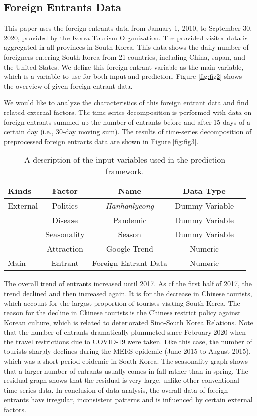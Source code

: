\documentclass[conference]{IEEEtran}
\begin{document}
\subsection{Foreign Entrants Data}\label{IT}

This paper uses the foreign entrants data from January 1, 2010, to September 30, 2020, provided by the Korea Tourism Organization. The provided visitor data is aggregated in all provinces in South Korea. This data shows the daily number of foreigners entering South Korea from 21 countries, including China, Japan, and the United States. We define this foreign entrant variable as the main variable, which is a variable to use for both input and prediction. Figure \ref{fig:fig2} shows the overview of given foreign entrant data.

We would like to analyze the characteristics of this foreign entrant data and find related external factors. The time-series decomposition is performed with data on foreign entrants summed up the number of entrants before and after 15 days of a certain day (i.e., 30-day moving sum). The results of time-series decomposition of preprocessed foreign entrants data are shown in Figure \ref{fig:fig3}. 

\begin{table}[t]
\centering
\caption{A description of the input variables used in the prediction framework.}
\begin{tabular}[t]{lcccc}
\hline
Kinds&Factor&Name&Data Type\\
\hline
External&Politics&\textit{Hanhanlyeong}&Dummy Variable\\
&Disease&Pandemic&Dummy Variable\\
&Seasonality&Season&Dummy Variable\\
&Attraction&Google Trend&Numeric\\
\hline
Main&Entrant&Foreign Entrant Data&Numeric\\
\hline
\end{tabular}
\label{table:tb1}
\end{table}

The overall trend of entrants increased until 2017. As of the first half of 2017, the trend declined and then increased again. It is for the decrease in Chinese tourists, which account for the largest proportion of tourists visiting South Korea. The reason for the decline in Chinese tourists is the Chinese restrict policy against Korean culture, which is related to deteriorated Sino-South Korea Relations. Note that the number of entrants dramatically plummeted since February 2020 when the travel restrictions due to COVID-19 were taken. Like this case, the number of tourists sharply declines during the MERS epidemic (June 2015 to August 2015), which was a short-period epidemic in South Korea. The seasonality graph shows that a larger number of entrants usually comes in fall rather than in spring. The residual graph shows that the residual is very large, unlike other conventional time-series data. In conclusion of data analysis, the overall data of foreign entrants have irregular, inconsistent patterns and is influenced by certain external factors.
\end{document}
